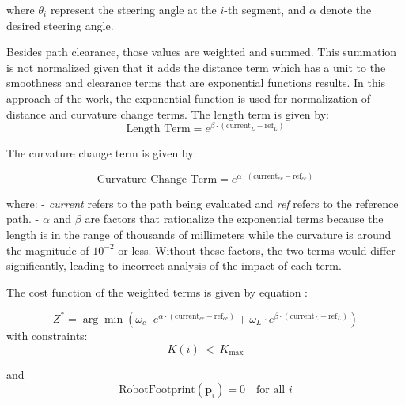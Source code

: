 where \( \theta_i \) represent the steering angle at the \(i\)-th segment, and \( \alpha \) denote the desired 
steering angle.

Besides path clearance, those values are weighted and summed.
This summation is not normalized given that it adds the distance term which has a unit to the smoothness and 
clearance terms that are exponential functions results. 
In this approach of the work, the exponential function is used for normalization of distance and curvature change 
terms. The length term is given by:
\begin{equation}
    \text{Length Term} = e^{\beta \cdot \left(\text{current}_L - \text{ref}_L\right)}
    \end{equation}
    
    \noindent
    The curvature change term is given by:
    \noindent
    
    \begin{equation}
    \text{Curvature Change Term} = e^{\alpha \cdot \left(\text{current}_{cc} - \text{ref}_{cc}\right)}
    \end{equation}
    
    \noindent
    where: 
    \newline
    - \textit{current} refers to the path being evaluated and \textit{ref} refers to the reference path.
    \newline
    - \(\alpha\) and \(\beta\) are factors that rationalize the exponential terms because the length is in the range 
    of thousands of millimeters while the curvature is around the magnitude of \(10^{-2}\) or less.
    Without these factors, the two terms would differ significantly, leading to incorrect analysis of the impact of each term.
    
\noindent The cost function of the weighted terms is given by equation :

\begin{equation}
Z^{\ast }=\arg \min \left(\omega_{c} \cdot e^{\alpha \cdot \left( \text{current}_{cc} - \text{ref}_{cc} \right)} + \omega_{L} 
\cdot e^{\beta \cdot \left( \text{current}_L - \text{ref}_L \right)} \right)
\label{exp_function}
\end{equation}
\noindent
with constraints: \[K(i)\ <\ K_{\max}\]
\noindent

and \[\text{RobotFootprint}(\mathbf{p}_i) = 0 \quad \text{for all } i\]


